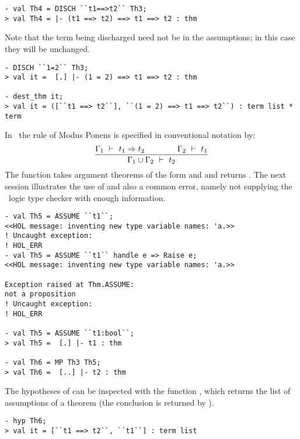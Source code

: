 \begin{session}
\begin{verbatim}
- val Th4 = DISCH ``t1==>t2`` Th3;
> val Th4 = |- (t1 ==> t2) ==> t1 ==> t2 : thm
\end{verbatim}
\end{session}
Note that the term being discharged need not be in the assumptions; in
this case they will be unchanged.

\begin{session}\begin{verbatim}
- DISCH ``1=2`` Th3;
> val it =  [.] |- (1 = 2) ==> t1 ==> t2 : thm

- dest_thm it;
> val it = ([``t1 ==> t2``], ``(1 = 2) ==> t1 ==> t2``) : term list * term
\end{verbatim}\end{session}

    In \HOL\, the rule  of Modus Ponens is specified in
    conventional notation by:
\[
\frac{\Gamma_1 \ \vdash\  t_1 \Rightarrow t_2 \qquad\qquad \Gamma_2\ \vdash\  t_1}
{\Gamma_1 \cup \Gamma_2 \ \vdash\  t_2}
\]
The \ML{} function  takes argument theorems of the form
 and  and
returns . The next session illustrates the use
of  and also a common error, namely not supplying the \HOL\
logic type checker with enough information.

\begin{session}\begin{verbatim}
- val Th5 = ASSUME ``t1``;
<<HOL message: inventing new type variable names: 'a.>>
! Uncaught exception:
! HOL_ERR 
- val Th5 = ASSUME ``t1`` handle e => Raise e;
<<HOL message: inventing new type variable names: 'a.>>

Exception raised at Thm.ASSUME:
not a proposition
! Uncaught exception:
! HOL_ERR 

- val Th5 = ASSUME ``t1:bool``;
> val Th5 =  [.] |- t1 : thm

- val Th6 = MP Th3 Th5;
> val Th6 =  [..] |- t2 : thm
\end{verbatim}\end{session}

The hypotheses of  can be inspected with the \ML{} function
\ml{hyp}, which returns the list of assumptions of a theorem (the
conclusion is returned by \ml{concl}).

\begin{session}\begin{verbatim}
- hyp Th6;
> val it = [``t1 ==> t2``, ``t1``] : term list
\end{verbatim}\end{session}

